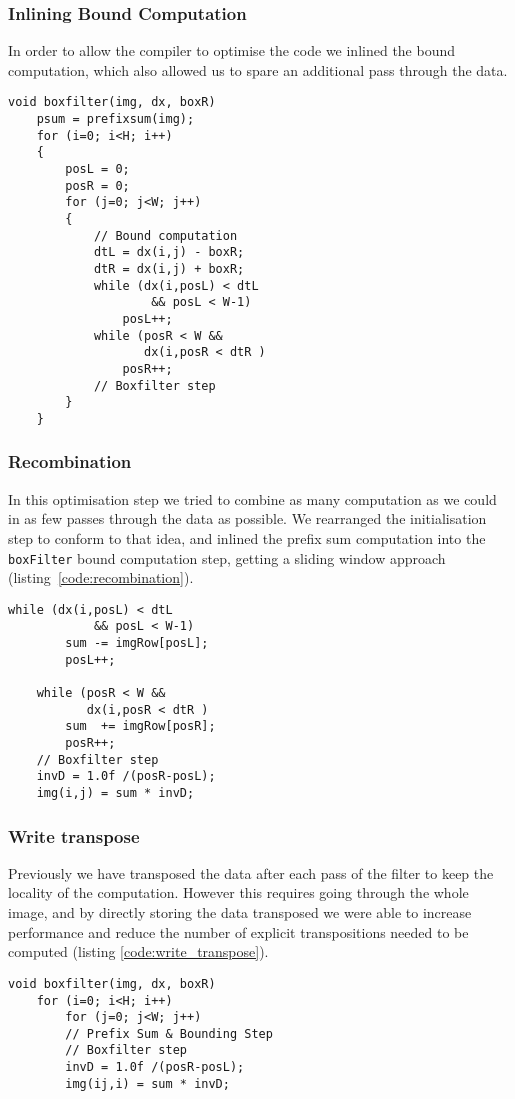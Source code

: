 \subsubsection{Inlining Bound Computation}

In order to allow the compiler to optimise the code we inlined the bound computation, which also allowed us to spare an additional pass through the data.

\begin{lstlisting}[caption=Inlining of the bound computation, label=code:inlining]
void boxfilter(img, dx, boxR) 
    psum = prefixsum(img);
    for (i=0; i<H; i++)
    {
        posL = 0;
        posR = 0;
        for (j=0; j<W; j++)
        {
            // Bound computation
            dtL = dx(i,j) - boxR;
            dtR = dx(i,j) + boxR;
            while (dx(i,posL) < dtL 
                    && posL < W-1)
                posL++;
            while (posR < W && 
                   dx(i,posR < dtR )
                posR++;
            // Boxfilter step
        }
    }
\end{lstlisting}

\subsubsection{Recombination}

In this optimisation step we tried to combine as many computation as we could in as few passes through the data as possible. We rearranged the initialisation step to conform to that idea, and inlined the prefix sum computation into the \lstinline{boxFilter} bound computation step, getting a sliding window approach (listing~\ref{code:recombination}).

\begin{lstlisting}[caption=Recombination, label=code:recombination]
    while (dx(i,posL) < dtL 
            && posL < W-1)
        sum -= imgRow[posL];
        posL++;

    while (posR < W && 
           dx(i,posR < dtR )
        sum  += imgRow[posR];
        posR++;
    // Boxfilter step
    invD = 1.0f /(posR-posL);
    img(i,j) = sum * invD;
\end{lstlisting}

\subsubsection{Write transpose}\label{sec:method:write_transposed}

Previously we have transposed the data after each pass of the filter to keep the locality of the computation. However this requires going through the whole image, and by directly storing the data transposed we were able to increase performance and reduce the number of explicit transpositions needed to be computed (listing \ref{code:write_transpose}). 
\begin{lstlisting}[caption=Write transpose, label=code:write_transpose]
void boxfilter(img, dx, boxR) 
    for (i=0; i<H; i++)
        for (j=0; j<W; j++)
        // Prefix Sum & Bounding Step
        // Boxfilter step
        invD = 1.0f /(posR-posL);
        img(ij,i) = sum * invD;
\end{lstlisting}

